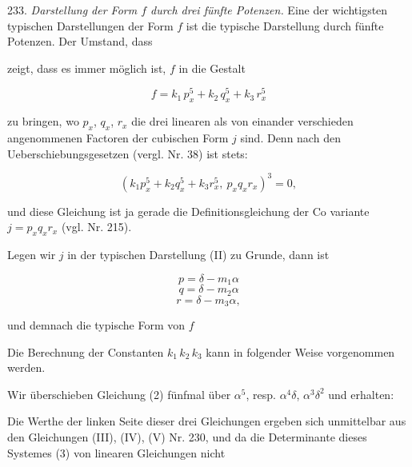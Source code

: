
233. \textit{Darstellung der Form $f$ durch drei fünfte Potenzen.} Eine
der wichtigsten typischen Darstellungen der Form $f$ ist die typische
Darstellung durch fünfte Potenzen. Der Umstand, dass


zeigt, dass es immer möglich ist, $f$ in die Gestalt

\[
f = k_1\,p_x^5 + k_2\,q_x^5 + k_3\,r_x^5
\]

zu bringen, wo $p_x$, $q_x$, $r_x$ die drei linearen als von einander
verschieden angenommenen Factoren der cubischen Form $j$ sind. Denn
nach den Ueberschiebungsgesetzen (vergl. Nr. 38) ist stets:

\[
(k_1p_x^5 + k_2q_x^5 + k_3r_x^5,\ p_xq_xr_x)^3 = 0,
\]

und diese Gleichung ist ja gerade die Definitionsgleichung der Co\-
variante $j = p_xq_xr_x$ (vgl. Nr. 215).

Legen wir $j$ in der typischen Darstellung (II) zu Grunde, dann ist

\[
p = \delta - m_1\alpha
\]
\[
q = \delta - m_2\alpha
\]
\[
r = \delta - m_3\alpha,
\]

und demnach die typische Form von $f$


Die Berechnung der Constanten $k_1\,k_2\,k_3$ kann in folgender Weise
vorgenommen werden.

Wir überschieben Gleichung (2) fünfmal über $\alpha^5$, resp. $\alpha^4\delta$,
$\alpha^3\delta^2$ und erhalten:


Die Werthe der linken Seite dieser drei Gleichungen ergeben sich
unmittelbar aus den Gleichungen (III), (IV), (V) Nr. 230, und da die
Determinante dieses Systemes (3) von linearen Gleichungen nicht


